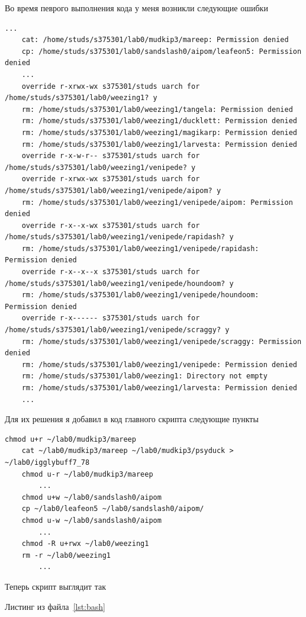     Во время певрого выполнения кода у меня возникли следующие ошибки
    \begin{lstlisting}[caption={Первый запуск},label={lst:result1}]
    ...
    cat: /home/studs/s375301/lab0/mudkip3/mareep: Permission denied
    cp: /home/studs/s375301/lab0/sandslash0/aipom/leafeon5: Permission denied
    ...
    override r-xrwx-wx s375301/studs uarch for /home/studs/s375301/lab0/weezing1? y
    rm: /home/studs/s375301/lab0/weezing1/tangela: Permission denied
    rm: /home/studs/s375301/lab0/weezing1/ducklett: Permission denied
    rm: /home/studs/s375301/lab0/weezing1/magikarp: Permission denied
    rm: /home/studs/s375301/lab0/weezing1/larvesta: Permission denied
    override r-x-w-r-- s375301/studs uarch for /home/studs/s375301/lab0/weezing1/venipede? y
    override r-xrwx-wx s375301/studs uarch for /home/studs/s375301/lab0/weezing1/venipede/aipom? y
    rm: /home/studs/s375301/lab0/weezing1/venipede/aipom: Permission denied
    override r-x--x-wx s375301/studs uarch for /home/studs/s375301/lab0/weezing1/venipede/rapidash? y
    rm: /home/studs/s375301/lab0/weezing1/venipede/rapidash: Permission denied
    override r-x--x--x s375301/studs uarch for /home/studs/s375301/lab0/weezing1/venipede/houndoom? y
    rm: /home/studs/s375301/lab0/weezing1/venipede/houndoom: Permission denied
    override r-x------ s375301/studs uarch for /home/studs/s375301/lab0/weezing1/venipede/scraggy? y
    rm: /home/studs/s375301/lab0/weezing1/venipede/scraggy: Permission denied
    rm: /home/studs/s375301/lab0/weezing1/venipede: Permission denied
    rm: /home/studs/s375301/lab0/weezing1: Directory not empty
    rm: /home/studs/s375301/lab0/weezing1/larvesta: Permission denied
    ...
    \end{lstlisting}

    Для их решения я добавил в код главного скрипта следующие пункты
    \begin{lstlisting}[caption={Добавление изменения прав},label={lst:codeedit}]
    chmod u+r ~/lab0/mudkip3/mareep
    cat ~/lab0/mudkip3/mareep ~/lab0/mudkip3/psyduck > ~/lab0/igglybuff7_78
    chmod u-r ~/lab0/mudkip3/mareep
        ...
    chmod u+w ~/lab0/sandslash0/aipom
    cp ~/lab0/leafeon5 ~/lab0/sandslash0/aipom/
    chmod u-w ~/lab0/sandslash0/aipom
        ...
    chmod -R u+rwx ~/lab0/weezing1
    rm -r ~/lab0/weezing1
        ...
    \end{lstlisting}

    Теперь скрипт выглядит так

    Листинг из файла~\ref{lst:bash}
    

